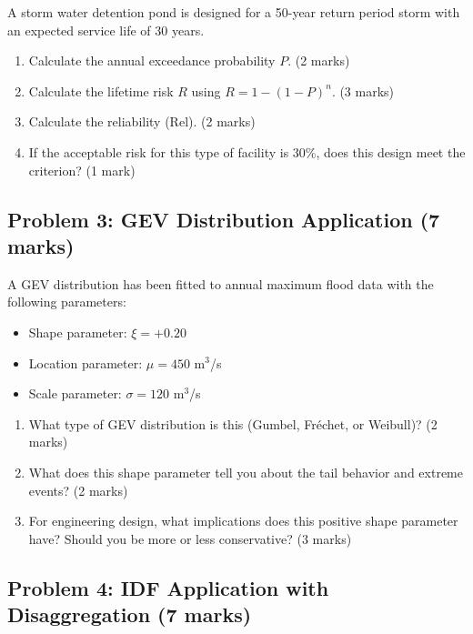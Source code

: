 \documentclass[11pt,a4paper]{article}
\begin{document}
A storm water detention pond is designed for a 50-year return period storm with an expected service life of 30 years.

\begin{enumerate}[label=\alph*)]
    \item Calculate the annual exceedance probability $P$. (2 marks)
    \item Calculate the lifetime risk $R$ using $R = 1-(1-P)^n$. (3 marks)
    \item Calculate the reliability (Rel). (2 marks)
    \item If the acceptable risk for this type of facility is 30\%, does this design meet the criterion? (1 mark)
\end{enumerate}

\vspace{8cm}

\newpage

\subsection*{Problem 3: GEV Distribution Application (7 marks)}

A GEV distribution has been fitted to annual maximum flood data with the following parameters:
\begin{itemize}[nosep]
    \item Shape parameter: $\xi = +0.20$
    \item Location parameter: $\mu = 450$ m$^3$/s
    \item Scale parameter: $\sigma = 120$ m$^3$/s
\end{itemize}

\begin{enumerate}[label=\alph*)]
    \item What type of GEV distribution is this (Gumbel, Fréchet, or Weibull)? (2 marks)
    \item What does this shape parameter tell you about the tail behavior and extreme events? (2 marks)
    \item For engineering design, what implications does this positive shape parameter have? Should you be more or less conservative? (3 marks)
\end{enumerate}

\vspace{7cm}

\subsection*{Problem 4: IDF Application with Disaggregation (7 marks)}
\end{document}
